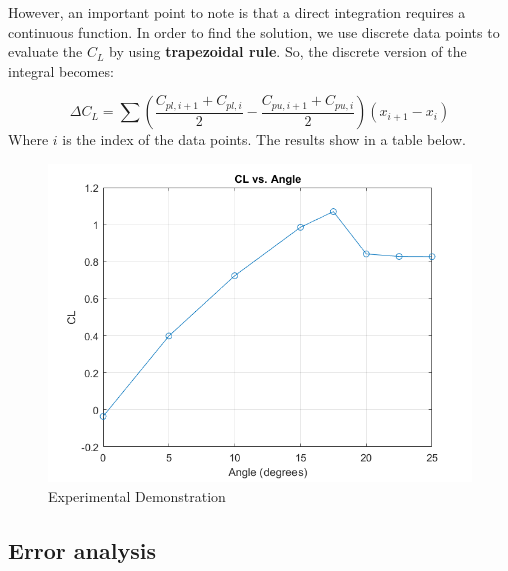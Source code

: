 However, an important point to note is that a direct integration requires a continuous function. In order to find the solution, we use discrete data points to evaluate the $C_L$ by using \textbf{trapezoidal rule}. So, the discrete version of the integral becomes:

$$
\Delta C_{L}=\sum\left(\frac{C_{pl,i+1}+C_{pl,i}}{2}-\frac{C_{p u ,i+1}+C_{p u ,i}}{2}\right)\left(x_{i+1}-x_{i}\right)
$$
Where $i$ is the index of the data points. The results show in a table below.

\begin{table}[]
    \end{table}

    \begin{figure}[htb] %
        \centering
        \includegraphics[scale=0.45]{CL.png}
        \caption{Experimental Demonstration}
        \label{fig:demo}
    \end{figure}



\subsection*{Error analysis}


